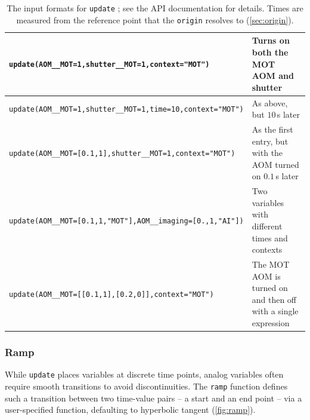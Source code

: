\documentclass{SciPost}
\newcommand{\python}[1]{%
  \texttt{#1}%
}
\begin{document}
\begin{table}
    \centering
    \begin{tabular}{l|p{15em}}
         \python{update(AOM__MOT=1,shutter__MOT=1,context="MOT")} & \small Turns on both the MOT AOM and shutter\\
         \hline
          \python{update(AOM__MOT=1,shutter__MOT=1,time=10,context="MOT")} & \small As above, but $10$\,s later\\
         \hline
         \python{update(AOM__MOT=[0.1,1],shutter__MOT=1,context="MOT")} & \small As the first entry, but with the AOM turned on $0.1$\,s later \\
         \hline
         \python{update(AOM__MOT=[0.1,1,"MOT"],AOM__imaging=[0.,1,"AI"])} & \small Two variables with different times and contexts \\\hline
         \python{update(AOM__MOT=[[0.1,1],[0.2,0]],context="MOT")} & \small The MOT AOM is turned on and then off with a single expression \\\hline
    \end{tabular}
    \caption{The input formats for \python{update}; see the API documentation \cite{wignertime_docs} for details. Times are measured from the reference point that the \python{origin} resolves to (\cref{sec:origin}).}
    \label{tab:inputSpecs}
\end{table}

\subsubsection{Ramp}
While \python{update} places variables at discrete time points, analog variables often require smooth transitions to avoid discontinuities. The \python{ramp} function defines such a transition between two time-value pairs – a start and an end point – via a user-specified function, defaulting to hyperbolic tangent (\cref{fig:ramp}).
 
\end{document}
